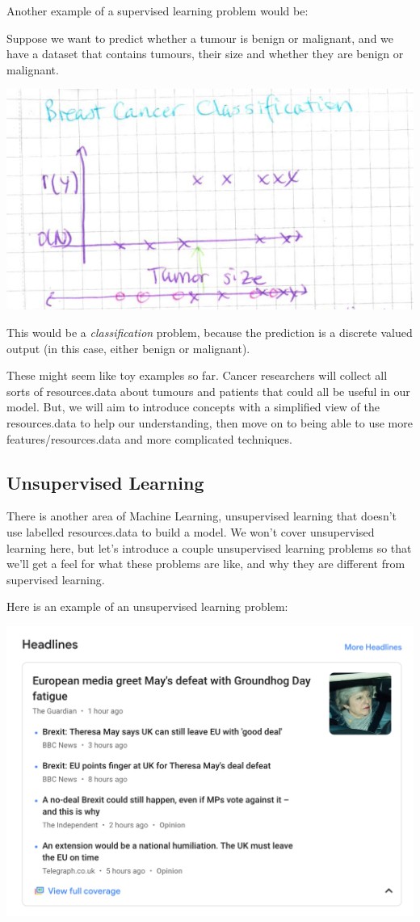 \documentclass[12pt]{article}
\begin{document}
Another example of a supervised learning problem would be:

Suppose we want to predict whether a tumour is benign or malignant, and we have a dataset that contains tumours, their size and whether they are benign or malignant.

\includegraphics[width={\textwidth}]{tumour-size}

This would be a \textit{classification} problem, because the prediction is a discrete valued output (in this case, either benign or malignant). 

These might seem like toy examples so far. Cancer researchers will collect all sorts of resources.data about tumours and patients that could all be useful in our model. But, we will aim to introduce concepts with a simplified view of the resources.data to help our understanding, then move on to being able to use more features/resources.data and more complicated techniques.

\subsection{Unsupervised Learning}

There is another area of Machine Learning, unsupervised learning that doesn't use labelled resources.data to build a model. We won't cover unsupervised learning here, but let's introduce a couple unsupervised learning problems so that we'll get a feel for what these problems are like, and why they are different from supervised learning.

Here is an example of an unsupervised learning problem:

\includegraphics[width={\textwidth}]{google-news}
\end{document}
